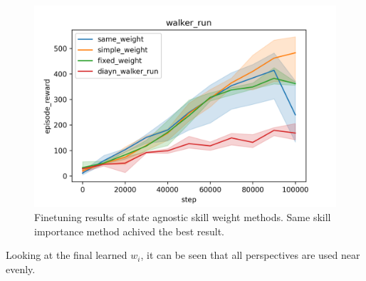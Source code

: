

  \begin{figure}[ht]
    \vskip 0.2in
    \begin{center}
    \centerline{\includegraphics[width=\columnwidth]{Figures/multiple_seed_state_agnostic_methods.png}}
    \caption{Finetuning results of state agnostic skill weight methods. Same skill importance method achived the best result.}
    \label{state agnostic results}
    \end{center}
    \vskip -0.2in
    \end{figure}
Looking at the final learned ${w_i}$, it can be seen that all perspectives are used near evenly.


